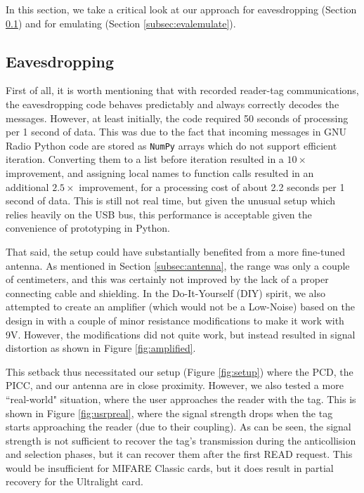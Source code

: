 \documentclass[fleqn,10pt]{SelfArx} %
\begin{document}
In this section, we take a critical look at our approach for eavesdropping (Section \ref{subsec:evaleavesdrop}) and for emulating (Section \ref{subsec:evalemulate}).

\subsection{Eavesdropping}
\label{subsec:evaleavesdrop}

First of all, it is worth mentioning that with recorded reader-tag communications, the eavesdropping code behaves predictably and always correctly decodes the messages. However, at least initially, the code required 50 seconds of processing per 1 second of data. This was due to the fact that incoming messages in GNU Radio Python code are stored as \texttt{NumPy} arrays which do not support efficient iteration. Converting them to a list before iteration resulted in a $10\times$ improvement, and assigning local names to function calls resulted in an additional $2.5\times$ improvement, for a processing cost of about 2.2 seconds per 1 second of data. This is still not real time, but given the unusual setup which relies heavily on the USB bus, this performance is acceptable given the convenience of prototyping in Python. 

That said, the setup could have substantially benefited from a more fine-tuned antenna. As mentioned in Section \ref{subsec:antenna}, the range was only a couple of centimeters, and this was certainly not improved by the lack of a proper connecting cable and shielding. In the Do-It-Yourself (DIY) spirit, we also attempted to create an amplifier (which would not be a Low-Noise) based on the design in \cite{amplifier} with a couple of minor resistance modifications to make it work with 9V. However, the modifications did not quite work, but instead resulted in signal distortion as shown in Figure \ref{fig:amplified}.



This setback thus necessitated our setup (Figure \ref{fig:setup}) where the PCD, the PICC, and our antenna are in close proximity. However, we also tested a more ``real-world" situation, where the user approaches the reader with the tag. This is shown in Figure \ref{fig:usrpreal}, where the signal strength drops when the tag starts approaching the reader (due to their coupling). As can be seen, the signal strength is not sufficient to recover the tag's transmission during the anticollision and selection phases, but it can recover them after the first READ request. This would be insufficient for MIFARE Classic cards, but it does result in partial recovery for the Ultralight card.
\end{document}
